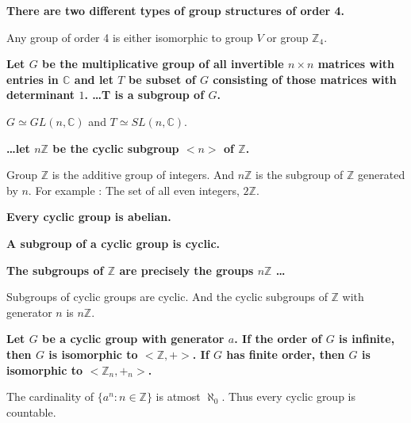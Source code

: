 \documentclass[a4paper,12pt,openany]{book}
\newcommand{\iso}{\simeq} %
\begin{document}
\textbf{There are two different types of group structures of order 4.}
\textbf{\phantom{}}\\
\begin{story}
	Any group of order 4 is either isomorphic to group $V$ or group $\mathbb{Z}_4$.
\end{story}

\textbf{\phantom{}}
\textbf{Let $G$ be the multiplicative group of all invertible $n\times n$ matrices with entries in $\mathbb{C}$ and  let $T$ be subset of $G$ consisting of those matrices with determinant $1$. \dots T is a subgroup of $G$.}\\
\begin{story}
	$G \iso GL(n,\mathbb{C})$ and $T \iso SL(n,\mathbb{C})$.
\end{story}

\textbf{\phantom{}}
\textbf{\dots let $n\mathbb{Z}$ be the cyclic subgroup $<\!n\!>$ of $\mathbb{Z}$.}\\
\begin{story}
	Group $\mathbb{Z}$ is the additive group of integers.
	And $n\mathbb{Z}$ is the subgroup of $\mathbb{Z}$ generated by $n$.
	For example : The set of all even integers, $2\mathbb{Z}$.
\end{story}

\textbf{\phantom{}}
\textbf{Every cyclic group is abelian.}

\textbf{\phantom{}}
\textbf{A subgroup of a cyclic group is cyclic.}

\textbf{\phantom{}}
\textbf{The subgroups of $\mathbb{Z}$ are precisely the groups $n\mathbb{Z}$ \dots}\\
\begin{story}
	Subgroups of cyclic groups are cyclic.
	And the cyclic subgroups of $\mathbb{Z}$ with generator $n$ is $n\mathbb{Z}$.
\end{story}

\textbf{\phantom{}}
\textbf{Let $G$ be a cyclic group with generator $a$. If the order of $G$ is infinite, then $G$ is isomorphic to $<\!\mathbb{Z},+\!>$. If $G$ has finite order, then $G$ is isomorphic to $<\!\mathbb{Z}_n,+_n\!>$.}\\
\begin{challenge}
	The cardinality of $\{a^n : n \in \mathbb{Z} \}$ is atmost $\aleph_0$.
	Thus every cyclic group is countable.
\end{challenge}
\end{document}
